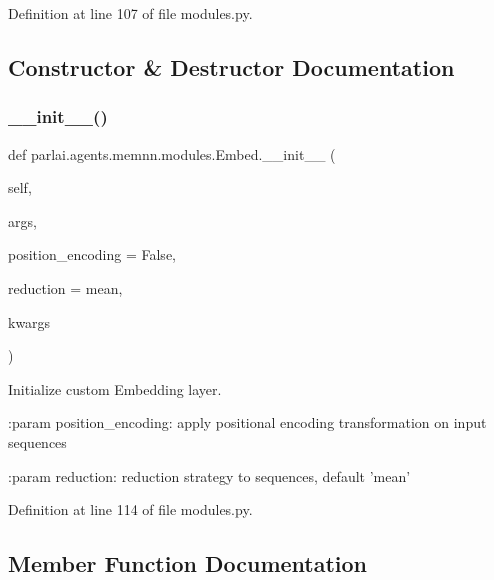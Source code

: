 Definition at line 107 of file modules.\+py.



\subsection{Constructor \& Destructor Documentation}
\mbox{\label{classparlai_1_1agents_1_1memnn_1_1modules_1_1Embed_a3d901aa67e52a3ea160b5f41acecd2c6}} 
\subsubsection{\texorpdfstring{\+\_\+\+\_\+init\+\_\+\+\_\+()}{\_\_init\_\_()}}
{\footnotesize\ttfamily def parlai.\+agents.\+memnn.\+modules.\+Embed.\+\_\+\+\_\+init\+\_\+\+\_\+ (\begin{DoxyParamCaption}\item[{}]{self,  }\item[{}]{args,  }\item[{}]{position\+\_\+encoding = {\ttfamily False},  }\item[{}]{reduction = {\ttfamily \textquotesingle{}mean\textquotesingle{}},  }\item[{}]{kwargs }\end{DoxyParamCaption})}

\begin{DoxyVerb}Initialize custom Embedding layer.

:param position_encoding:
    apply positional encoding transformation on input sequences

:param reduction:
    reduction strategy to sequences, default 'mean'
\end{DoxyVerb}
 

Definition at line 114 of file modules.\+py.



\subsection{Member Function Documentation}
\mbox{\label{classparlai_1_1agents_1_1memnn_1_1modules_1_1Embed_a03a7701e101296fbbf28dcc05039c248}} 
